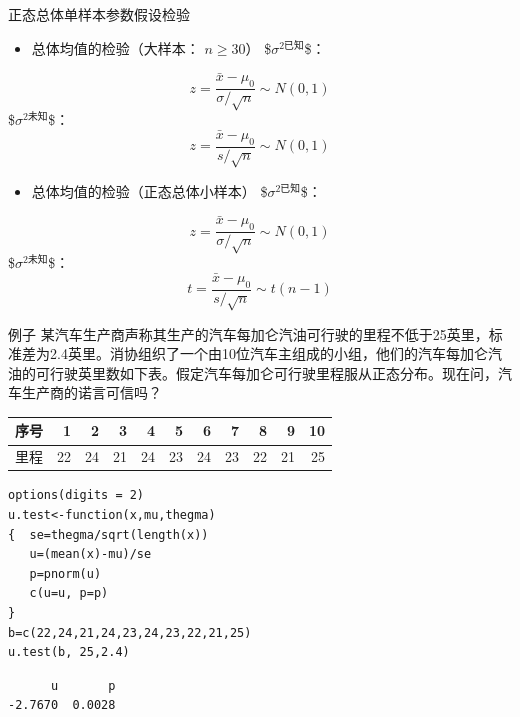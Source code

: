 \documentclass[presentation]{beamer}
\begin{document}
\begin{frame}[label={sec:orgdb34051}]{正态总体单样本参数假设检验}
\begin{itemize}
\item 总体均值的检验（大样本： \(n \ge 30\)）  
\$\(\sigma^{\text{2已知}}\)\$：
\end{itemize}
$$ z=\frac{\bar x-\mu_0}{\sigma/\sqrt{n}}\sim N(0,1)$$
 \$\(\sigma^{\text{2未知}}\)\$：
$$ z=\frac{\bar x-\mu_0}{s/\sqrt{n}}\sim N(0,1)$$
\begin{itemize}
\item 总体均值的检验（正态总体小样本）  
\$\(\sigma^{\text{2已知}}\)\$：
\end{itemize}
$$ z=\frac{\bar x-\mu_0}{\sigma/\sqrt{n}}\sim N(0,1)$$
 \$\(\sigma^{\text{2未知}}\)\$：
$$ t=\frac{\bar x-\mu_0}{s/\sqrt{n}}\sim t(n-1)$$
\end{frame}

\begin{frame}[fragile,label={sec:org76d20db}]{例子}
 某汽车生产商声称其生产的汽车每加仑汽油可行驶的里程不低于25英里，标准差为2.4英里。消协组织了一个由10位汽车主组成的小组，他们的汽车每加仑汽油的可行驶英里数如下表。假定汽车每加仑可行驶里程服从正态分布。现在问，汽车生产商的诺言可信吗？

\begin{center}
\begin{tabular}{lrrrrrrrrrr}
序号 & 1 & 2 & 3 & 4 & 5 & 6 & 7 & 8 & 9 & 10\\
\hline
里程 & 22 & 24 & 21 & 24 & 23 & 24 & 23 & 22 & 21 & 25\\
\end{tabular}
\end{center}
\begin{verbatim}
options(digits = 2)
u.test<-function(x,mu,thegma)
{  se=thegma/sqrt(length(x))
   u=(mean(x)-mu)/se
   p=pnorm(u)
   c(u=u, p=p)
}
b=c(22,24,21,24,23,24,23,22,21,25)
u.test(b, 25,2.4)

\end{verbatim}

\begin{verbatim}
      u       p 
-2.7670  0.0028 
\end{verbatim}
\end{frame}
\end{document}
